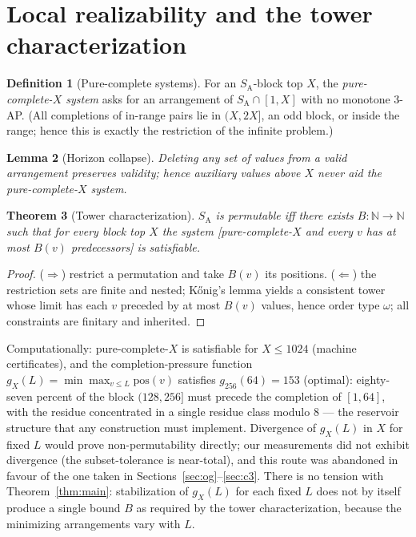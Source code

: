\documentclass[11pt]{article}
\newtheorem{theorem}{Theorem}
\newtheorem{lemma}[theorem]{Lemma}
\theoremstyle{definition}
\newtheorem{definition}[theorem]{Definition}
\newcommand{\N}{\mathbb{N}}
\newcommand{\SA}{S_{\mathrm{A}}}
\newcommand{\pos}{\mathrm{pos}}
\begin{document}
\section{Local realizability and the tower characterization}

\begin{definition}[Pure-complete systems]
For an $\SA$-block top $X$, the \emph{pure-complete-$X$ system} asks for an
arrangement of $\SA \cap [1, X]$ with no monotone 3-AP. (All completions of
in-range pairs lie in $(X, 2X]$, an odd block, or inside the range; hence this
is exactly the restriction of the infinite problem.)
\end{definition}

\begin{lemma}[Horizon collapse]
Deleting any set of values from a valid arrangement preserves validity; hence
auxiliary values above $X$ never aid the pure-complete-$X$ system.
\end{lemma}

\begin{theorem}[Tower characterization]
$\SA$ is permutable iff there exists $B\colon \N \to \N$ such that for every
block top $X$ the system [pure-complete-$X$ and every $v$ has at most $B(v)$
predecessors] is satisfiable.
\end{theorem}

\begin{proof}
($\Rightarrow$) restrict a permutation and take $B(v)$ its positions.
($\Leftarrow$) the restriction sets are finite and nested; K\H{o}nig's lemma
yields a consistent tower whose limit has each $v$ preceded by at most $B(v)$
values, hence order type $\omega$; all constraints are finitary and inherited.
\end{proof}

Computationally: pure-complete-$X$ is satisfiable for $X \le 1024$ (machine
certificates), and the completion-pressure function
$g_X(L) = \min \max_{v \le L} \pos(v)$ satisfies $g_{256}(64) = 153$
(optimal): eighty-seven percent of the block $(128,256]$ must precede the
completion of $[1,64]$, with the residue concentrated in a single residue
class modulo 8 --- the reservoir structure that any construction must
implement. Divergence of $g_X(L)$ in $X$ for fixed $L$ would prove
non-permutability directly; our measurements did not exhibit divergence
(the subset-tolerance is near-total), and this route was abandoned in favour
of the one taken in Sections~\ref{sec:og}--\ref{sec:c3}. There is no
tension with Theorem~\ref{thm:main}: stabilization of $g_X(L)$ for each
fixed $L$ does not by itself produce a single bound $B$ as required by the
tower characterization, because the minimizing arrangements vary with $L$.
\end{document}
